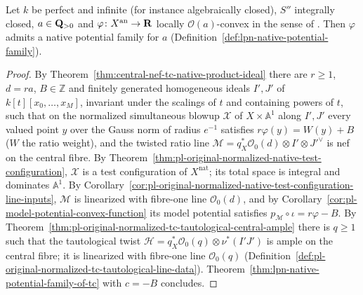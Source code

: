 \begin{theorem}\label{thm:lpn-native-potential-family-exists}
\leanok
{}
Let $k$ be perfect and infinite (for instance algebraically closed), $S''$ integrally closed, $a\in\mathbf{Q}_{>0}$ and
$\varphi\colon X^{\mathrm{an}}\to\mathbf{R}$ locally $\mathcal O(a)$-convex in the sense of \cite[Definition~5.3]{FHX}. Then $\varphi$ admits a
native potential family for $a$ (Definition~\ref{def:lpn-native-potential-family}).
\end{theorem}

\begin{proof}
By Theorem~\ref{thm:central-nef-tc-native-product-ideal} there are $r\ge1$, $d=ra$, $B\in\mathbb Z$ and finitely generated
homogeneous ideals $I',J'$ of $k[t][x_0,\dots,x_M]$, invariant under the scalings of $t$ and containing powers of $t$,
such that on the normalized simultaneous blowup $\mathcal X$ of $X\times\mathbb A^1$ along $I',J'$ every valued point
$y$ over the Gauss norm of radius $e^{-1}$ satisfies $r\varphi(y)=W(y)+B$ ($W$ the ratio weight), and the twisted ratio
line $\mathcal M=q_X^*\mathcal O_0(d)\otimes I'\otimes J'^\vee$ is nef on the central fibre. By
Theorem~\ref{thm:pl-original-normalized-native-test-configuration}, $\mathcal X$ is a test configuration of $X^{\mathrm{nat}}$;
its total space is integral and dominates $\mathbb A^1$. By Corollary~\ref{cor:pl-original-normalized-native-test-configuration-line-inputs},
$\mathcal M$ is linearized with fibre-one line $\mathcal O_0(d)$, and by Corollary~\ref{cor:pl-model-potential-convex-function}
its model potential satisfies $p_{\mathcal M}\circ\iota=r\varphi-B$. By
Theorem~\ref{thm:pl-original-normalized-tc-tautological-central-ample} there is $q\ge1$ such that the tautological twist
$\mathcal H=q_X^*\mathcal O_0(q)\otimes\nu^*(I'J')$ is ample on the central fibre; it is linearized with fibre-one line
$\mathcal O_0(q)$ (Definition~\ref{def:pl-original-normalized-tc-tautological-line-data}). Theorem~\ref{thm:lpn-native-potential-family-of-tc}
with $c=-B$ concludes.
\end{proof}

